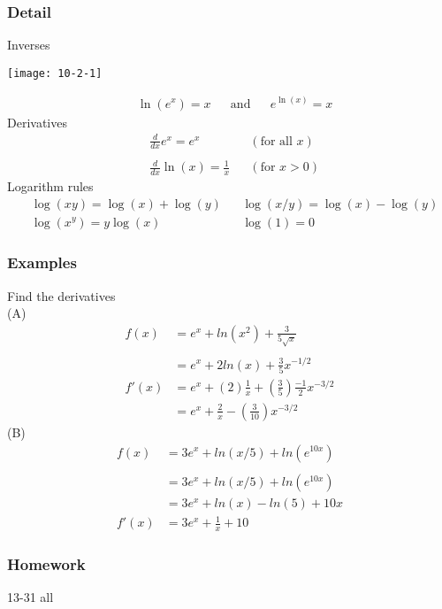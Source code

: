 \documentclass[14pt]{extarticle}
\begin{document}
\subsubsection*{Detail}
Inverses
\begin{center}
	\texttt{[image: 10-2-1]}
\end{center}
\begin{align*}
	&\ln(e^x) = x & & \text{and} & &e^{\ln(x)} = x 
\end{align*}
Derivatives
\begin{align*}
	&\frac{d}{dx}e^x =  e^x & &(\text{for all } x) \\\\
	&\frac{d}{dx}\ln(x) =  \frac{1}{x} & &(\text{for } x>0)
\end{align*}
Logarithm rules
\begin{align*}
	&\log(xy) = \log(x) + \log(y) & &\log(x/y)=\log(x)-\log(y) \\
	&\log(x^y)= y\log(x)	& &\log(1)=0
\end{align*}

\subsubsection*{Examples}
Find the derivatives
\\
(A)
\begin{align*}
	f(x) &= e^x + ln(x^2) + \frac{3}{5\sqrt{x}} \\\\
	&= e^x + 2ln(x) + \frac{3}{5}x^{-1/2} \\
	f'(x) &= e^x +(2)\frac{1}{x} + \left( \frac{3}{5}\right) \frac{-1}{2} x^{-3/2} \\
	&= e^x +\frac{2}{x} - \left( \frac{3}{10}\right) x^{-3/2}
\end{align*}
(B) 
\begin{align*}
	f(x) &= 3e^x + ln(x/5) + ln(e^{10x}) \\ \\
	&= 3e^x + ln(x/5) + ln(e^{10x}) \\
	&= 3e^x + ln(x) - ln(5 )+ 10x \\
	f'(x) &= 3e^x + \frac{1}{x} + 10
\end{align*}

\subsubsection*{Homework}
13-31 all
\end{document}
